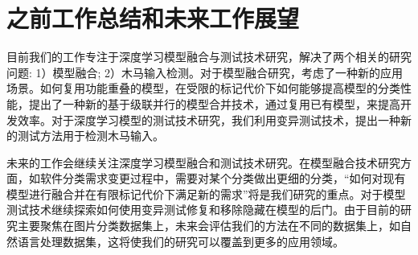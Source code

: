 \documentclass[fontset=macnew,UTF8]{article} %
\begin{document}
\section{之前工作总结和未来工作展望}

目前我们的工作专注于深度学习模型融合与测试技术研究，解决了两个相关的研究问题: 1）模型融合; 2）木马输入检测。对于模型融合研究，考虑了一种新的应用场景。如何复用功能重叠的模型，在受限的标记代价下如何能够提高模型的分类性能，提出了一种新的基于级联并行的模型合并技术，通过复用已有模型，来提高开发效率。对于深度学习模型的测试技术研究，我们利用变异测试技术，提出一种新的测试方法用于检测木马输入。

未来的工作会继续关注深度学习模型融合和测试技术研究。在模型融合技术研究方面，如软件分类需求变更过程中，需要对某个分类做出更细的分类，“如何对现有模型进行融合并在有限标记代价下满足新的需求”将是我们研究的重点。对于模型测试技术继续探索如何使用变异测试修复和移除隐藏在模型的后门。由于目前的研究主要聚焦在图片分类数据集上，未来会评估我们的方法在不同的数据集上，如自然语言处理数据集，这将使我们的研究可以覆盖到更多的应用领域。

\end{document}
